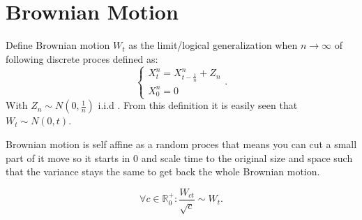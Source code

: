 \documentclass[a4paper,12pt]{article}
\begin{document}
\section{Brownian Motion}

\begin{definition}
    Define Brownian motion $W_{t}$ as the limit/logical generalization
    when $n \rightarrow \infty$ of following discrete proces defined as:
    \begin{equation}
        \begin{cases}
            X_{t}^{n} = X_{t-\frac{1}{n}}^{n} + Z_{n} \\
            X^{n}_{0}=0
        \end{cases}.
    \end{equation}
    With $Z_{n}\sim N(0,\frac{1}{n})$ i.i.d . From this definition it is easily seen that
    $W_{t} \sim N(0,t)$.
\end{definition}


\begin{lemma} \label{lem:self affine}
    Brownian motion is self affine as a random proces that means you can cut a small
    part of it move so it starts in $0$ and scale time to the original size
    and space such that the variance stays the same to get back the whole Brownian motion.
\end{lemma}

\begin{equation}
    \forall c \in \mathbb{R}^{+}_{0}: \frac{W_{ct}}{\sqrt{c}} \sim W_{t}.
\end{equation}
\end{document}
